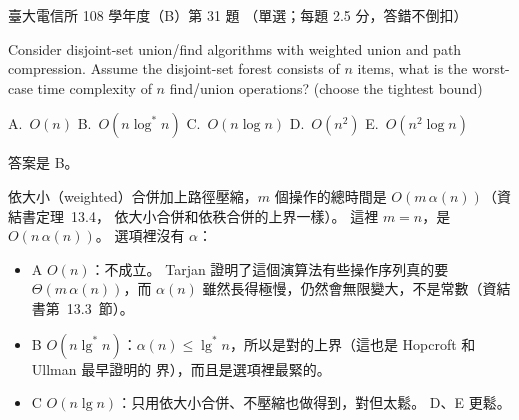 \begin{pastexam}[label={px:ntu-108-comm-dsab-31}]{臺大電信所 108 學年度（B）第 31 題}
（單選；每題 2.5 分，答錯不倒扣）

Consider disjoint-set union/find algorithms with weighted union and path compression. Assume the
disjoint-set forest consists of $n$ items, what is the worst-case time complexity of $n$
find/union operations? (choose the tightest bound)

A.~$O(n)$ \qquad B.~$O(n\log^* n)$ \qquad C.~$O(n\log n)$ \qquad D.~$O(n^2)$ \qquad
E.~$O(n^2\log n)$
\end{pastexam}

\begin{pastsoln}
答案是 B。

依大小（weighted）合併加上路徑壓縮，$m$ 個操作的總時間是 $O(m\,\alpha(n))$（資結書定理~13.4，
依大小合併和依秩合併的上界一樣）。 這裡 $m = n$，是 $O(n\,\alpha(n))$。 選項裡沒有 $\alpha$：
\begin{itemize}
\item A $O(n)$：不成立。 Tarjan 證明了這個演算法有些操作序列真的要 $\Theta(m\,\alpha(n))$，而
$\alpha(n)$ 雖然長得極慢，仍然會無限變大，不是常數（資結書第~13.3~節）。
\item B $O(n \lg^* n)$：$\alpha(n) \le \lg^* n$，所以是對的上界（這也是 Hopcroft 和 Ullman 最早證明的
界），而且是選項裡最緊的。
\item C $O(n \lg n)$：只用依大小合併、不壓縮也做得到，對但太鬆。 D、E 更鬆。
\end{itemize}
\end{pastsoln}
